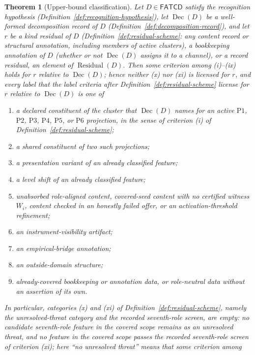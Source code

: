 \documentclass[11pt]{article}
\newtheorem{theorem}{Theorem}[section]
\theoremstyle{definition}
\newcommand{\FATCD}{\ensuremath{\mathsf{FATCD}}}
\newcommand{\Dec}[1]{\ensuremath{\operatorname{Dec}\!\left(#1\right)}}
\newcommand{\Residual}[1]{\ensuremath{\operatorname{Residual}\!\left(#1\right)}}
\newcommand{\Pone}{\ensuremath{\mathrm{P1}}}
\newcommand{\Ptwo}{\ensuremath{\mathrm{P2}}}
\newcommand{\Pthree}{\ensuremath{\mathrm{P3}}}
\newcommand{\Pfour}{\ensuremath{\mathrm{P4}}}
\newcommand{\Pfive}{\ensuremath{\mathrm{P5}}}
\newcommand{\Psix}{\ensuremath{\mathrm{P6}}}
\begin{document}
\begin{theorem}[Upper-bound classification]\label{thm:upper-bound-classification}
Let \(D \in \FATCD{}\) satisfy the recognition hypothesis
(Definition~\ref{def:recognition-hypothesis}), let \(\Dec{D}\) be a
well-formed decomposition record of \(D\)
(Definition~\ref{def:decomposition-record}), and let \(r\) be a kind residual
of \(D\) (Definition~\ref{def:residual-scheme}: any content record or structural
annotation, including members of active clusters), a bookkeeping annotation of \(D\) (whether or not \(\Dec{D}\) assigns it to a channel), or a record residual, an
element of \(\Residual{D}\). Then some criterion among (i)--(ix) holds for \(r\) relative to \(\Dec{D}\); hence neither (x) nor (xi) is licensed for \(r\), and
every label that the label criteria after Definition~\ref{def:residual-scheme}
license for \(r\) relative to \(\Dec{D}\) is one of
\begin{enumerate}[label=(\roman*),topsep=2pt,itemsep=1pt]
  \item a declared constituent of the cluster that \(\Dec{D}\) names for an
    active \Pone{}, \Ptwo{}, \Pthree{}, \Pfour{}, \Pfive{}, or \Psix{}
    projection, in the sense of criterion (i) of Definition~\ref{def:residual-scheme};
  \item a shared constituent of two such projections;
  \item a presentation variant of an already classified feature;
  \item a level shift of an already classified feature;
  \item unabsorbed role-aligned content, covered-seed content with no
    certified witness \(W_i\), content checked in an honestly failed offer, or an activation-threshold refinement;
  \item an instrument-visibility artifact;
  \item an empirical-bridge annotation;
  \item an outside-domain structure;
  \item already-covered bookkeeping or annotation data, or role-neutral data
    without an assertion of its own.
\end{enumerate}
In particular, categories (x) and (xi) of
Definition~\ref{def:residual-scheme}, namely the unresolved-threat category and the recorded seventh-role
screen, are empty: no candidate
seventh-role feature in the covered scope remains as an unresolved threat, and
no feature in the covered scope passes the recorded seventh-role screen of
criterion (xi); here ``no unresolved threat'' means that some criterion among

\end{theorem}
\end{document}

